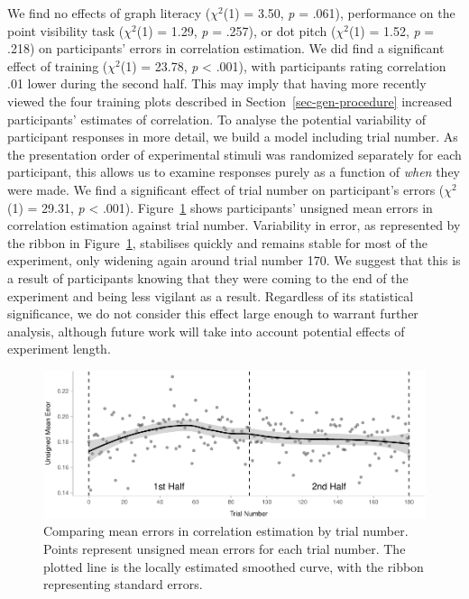 \documentclass[manuscript, review, anonymous, screen]{acmart}
\begin{document}
We find no effects of graph literacy (\(\chi^2\)(1) = 3.50, \emph{p} =
.061), performance on the point visibility task (\(\chi^2\)(1) = 1.29,
\emph{p} = .257), or dot pitch (\(\chi^2\)(1) = 1.52, \emph{p} = .218)
on participants' errors in correlation estimation. We did find a
significant effect of training (\(\chi^2\)(1) = 23.78, \emph{p}
\textless{} .001), with participants rating correlation .01 lower during
the second half. This may imply that having more recently viewed the
four training plots described in Section~\ref{sec-gen-procedure}
increased participants' estimates of correlation. To analyse the
potential variability of participant responses in more detail, we build
a model including trial number. As the presentation order of
experimental stimuli was randomized separately for each participant,
this allows us to examine responses purely as a function of \emph{when}
they were made. We find a significant effect of trial number on
participant's errors (\(\chi^2\)(1) = 29.31, \emph{p} \textless{} .001).
Figure~\ref{fig-time-plot} shows participants' unsigned mean errors in
correlation estimation against trial number. Variability in error, as
represented by the ribbon in Figure~\ref{fig-time-plot}, stabilises
quickly and remains stable for most of the experiment, only widening
again around trial number 170. We suggest that this is a result of
participants knowing that they were coming to the end of the experiment
and being less vigilant as a result. Regardless of its statistical
significance, we do not consider this effect large enough to warrant
further analysis, although future work will take into account potential
effects of experiment length.

\begin{figure}

{\centering \includegraphics[width=1\textwidth,height=\textheight]{size_and_opacity_files/figure-pdf/fig-time-plot-1.pdf}

}

\caption{\label{fig-time-plot}Comparing mean errors in correlation
estimation by trial number. Points represent unsigned mean errors for
each trial number. The plotted line is the locally estimated smoothed
curve, with the ribbon representing standard errors.}

\end{figure}
\end{document}
